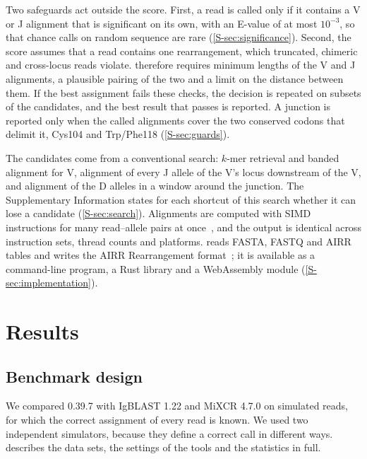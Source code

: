 \documentclass[11pt,a4paper]{article}
\begin{document}
Two safeguards act outside the score. First, a read is called only if it
contains a V or J alignment that is significant on its own, with an E-value
of at most $10^{-3}$, so that chance calls on random sequence are rare
(\cref{S-sec:significance}). Second, the score assumes that a read contains
one rearrangement, which truncated, chimeric and cross-locus reads violate. \swig{} therefore requires minimum lengths of the V and J
alignments, a plausible pairing of the two and a limit on the distance
between them. If the best assignment fails these checks, the decision is
repeated on subsets of the candidates, and the best result that passes is
reported. A junction is reported only when the called alignments cover the
two conserved codons that delimit it, Cys104 and Trp/Phe118
(\cref{S-sec:guards}).

The candidates come from a conventional search: $k$-mer retrieval and banded
alignment for V, alignment of every J allele of the V's locus downstream of
the V, and alignment of the D alleles in a window around the junction. The
Supplementary Information states for each shortcut of this search whether it
can lose a candidate (\cref{S-sec:search}). Alignments are computed with
SIMD instructions for many read--allele pairs at once~\cite{rognes2011}, and
the output is identical across instruction sets, thread counts and
platforms. \swig{} reads FASTA, FASTQ and AIRR tables and writes the AIRR
Rearrangement format~\cite{vanderheiden2018airr}; it is available as a
command-line program, a Rust library and a WebAssembly module
(\cref{S-sec:implementation}).

\section{Results}
\label{sec:results}
\suppressfloats[t]

\subsection{Benchmark design}
\label{sec:evaluation}

We compared \swig{} 0.39.7 with IgBLAST 1.22 and MiXCR 4.7.0 on simulated
reads, for which the correct assignment of every read is known. We used two
independent simulators, because they define a correct call in different
ways.  describes the data sets, the settings of the
tools and the statistics in full.
\end{document}
